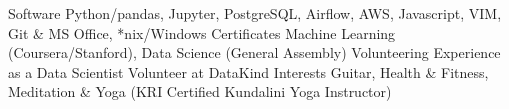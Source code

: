 \begin{additionals}
  \addional
    {Software}{ Python/pandas, Jupyter, PostgreSQL, Airflow, AWS, Javascript, VIM, Git \& MS Office, *nix/Windows}
  \addional
    {Certificates}{ Machine Learning (Coursera/Stanford), Data Science (General Assembly)}
  \addional
    {Volunteering}
    {Experience as a Data Scientist Volunteer at DataKind}
  \addional
    {Interests}{ Guitar, Health \& Fitness, Meditation \& Yoga (KRI Certified Kundalini Yoga Instructor)}
\end{additionals}


